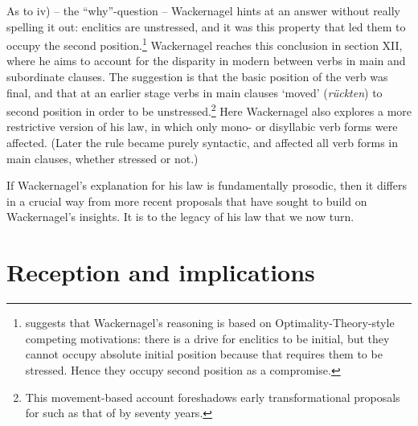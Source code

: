 As to iv) -- the ``why''-question -- Wackernagel hints at an answer without really spelling it out: enclitics are unstressed, and it was this property that led them to occupy the second position.\footnote{\citet[294--295]{Hale2017} suggests that Wackernagel's reasoning is based on Optimality-Theory-style competing motivations: there is a drive for enclitics to be initial, but they cannot occupy absolute initial position because that requires them to be stressed. Hence they occupy second position as a compromise.} Wackernagel reaches this conclusion in section XII, where he aims to account for the disparity in modern  between verbs in main and subordinate clauses. The suggestion is that the basic position of the verb was final, and that at an earlier stage verbs in main clauses `moved' (\textit{rückten}) to second position in order to be unstressed.\footnote{This movement-based account foreshadows early transformational proposals for  such as that of \citet{Bach1962} by seventy years.} Here Wackernagel also explores a more restrictive version of his law, in which only mono- or disyllabic verb forms were affected. (Later the rule became purely syntactic, and affected all verb forms in main clauses, whether stressed or not.)

If Wackernagel's explanation for his law is fundamentally prosodic, then it differs in a crucial way from more recent proposals that have sought to build on Wackernagel's insights. It is to the legacy of his law that we now turn.

\section{Reception and implications}\label{reception-implications}

